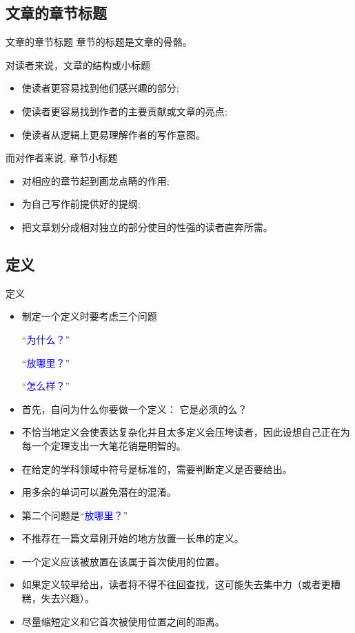 \documentclass[13pt]{ctexbeamer}
\newcommand{\blue}[1]{\textcolor{blue}{#1}}
\begin{document}
\subsection{文章的章节标题}
\begin{frame}{文章的章节标题}
章节的标题是文章的骨骼。

对读者来说，文章的结构或小标题

\begin{itemize}
    \item  使读者更容易找到他们感兴趣的部分;
\item 使读者更容易找到作者的主要贡献或文章的亮点;
\item 使读者从逻辑上更易理解作者的写作意图。
\end{itemize}


而对作者来说, 章节小标题
\begin{itemize}
    \item  对相应的章节起到画龙点睛的作用;

\item 为自己写作前提供好的提纲;

\item 把文章划分成相对独立的部分使目的性强的读者直奔所需。
\end{itemize}
\end{frame}




\subsection{定义}
\begin{frame}{定义}
	\begin{itemize}
		\item 
		制定一个定义时要考虑三个问题
		
		``\blue{为什么？}'' 
		
		``\blue{放哪里？}'' 
		
		``\blue{怎么样？}'' 
		\item 
		首先，自问为什么你要做一个定义： 它是必须的么？
		\item 
		不恰当地定义会使表达复杂化并且太多定义会压垮读者，因此设想自己正在为每一个定理支出一大笔花销是明智的。
		\item 
		在给定的学科领域中符号是标准的，需要判断定义是否要给出。
		\item 
		用多余的单词可以避免潜在的混淆。
	\end{itemize}
\end{frame}


\begin{frame}
	\begin{itemize}
		\item  第二个问题是``\blue{放哪里？}'' 
		\item 不推荐在一篇文章刚开始的地方放置一长串的定义。
		\item  一个定义应该被放置在该属于首次使用的位置。
		\item 如果定义较早给出，读者将不得不往回查找，这可能失去集中力（或者更糟糕，失去兴趣）。
		\item 尽量缩短定义和它首次被使用位置之间的距离。
	\end{itemize}
\end{frame}
\end{document}
